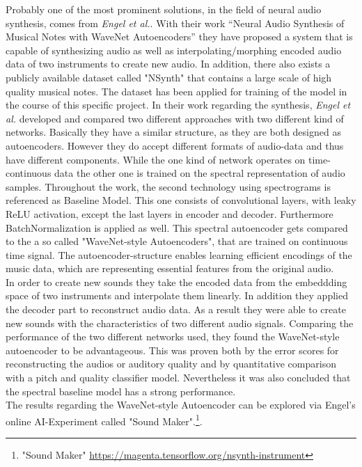 Probably one of the most prominent solutions, in the field of neural audio synthesis, comes from \textit{Engel et al.}. \cite{Engel2017} With their work “Neural Audio Synthesis of Musical Notes with WaveNet Autoencoders” they have proposed a system that is capable of synthesizing audio as well as interpolating/morphing encoded audio data of two instruments to create new audio. In addition, there also exists a publicly available dataset called "NSynth" that contains a large scale of high quality musical notes. The dataset has been applied for training of the model in the course of this specific project. In their work regarding the synthesis, \textit{Engel et al.} developed and compared two different approaches with two different kind of networks. Basically they have a similar structure, as they are both designed as autoencoders. However they do accept different formats of audio-data and thus have different components. While the one kind of network operates on time-continuous data the other one is trained on the spectral representation of audio samples. Throughout the work, the second technology using spectrograms is referenced as Baseline Model. This one consists of convolutional layers, with leaky ReLU activation, except the last layers in encoder and decoder. Furthermore BatchNormalization is applied as well. This spectral autoencoder gets compared to the a so called "WaveNet-style Autoencoders", that are trained on continuous time signal. The autoencoder-structure enables learning efficient encodings of the music data, which are representing essential features from the original audio.\\
In order to create new sounds they take the encoded data from the embeddding space of two instruments and interpolate them linearly. In addition they applied the decoder part to reconstruct audio data. As a result they were able to create new sounds with the characteristics of two different audio signals. Comparing the performance of the two different networks used, they found the WaveNet-style autoencoder to be advantageous. This was proven both by the error scores for reconstructing the audios or auditory quality and by quantitative comparison with a pitch and quality classifier model. Nevertheless it was also concluded that the spectral baseline model has a strong performance.\\
The results regarding the WaveNet-style Autoencoder can be explored via Engel's online AI-Experiment called "Sound Maker".\footnote{"Sound Maker" \url{https://magenta.tensorflow.org/nsynth-instrument}}.\\

